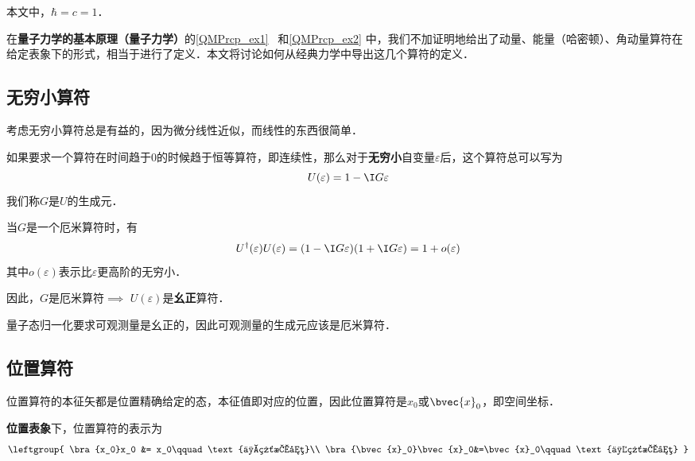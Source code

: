 

本文中，$\hbar=c=1$．

在\textbf{量子力学的基本原理（量子力学）}的\autoref{QMPrcp_ex1}~ 和\autoref{QMPrcp_ex2} 中，我们不加证明地给出了动量、能量（哈密顿）、角动量算符在给定表象下的形式，相当于进行了定义．本文将讨论如何从经典力学中导出这几个算符的定义．

\subsection{无穷小算符}

考虑无穷小算符总是有益的，因为微分线性近似，而线性的东西很简单．

如果要求一个算符在时间趋于$0$的时候趋于恒等算符，即连续性，那么对于\textbf{无穷小}自变量$\varepsilon$后，这个算符总可以写为
\begin{equation}\label{OprQM_eq1}
U(\varepsilon) = 1-\I G\varepsilon
\end{equation}
我们称$G$是$U$的生成元．

当$G$是一个厄米算符时，有
\begin{equation}
U^{\dagger}(\varepsilon)U(\varepsilon) = (1-\I G\varepsilon)(1+\I G\varepsilon) = 1+o(\varepsilon)
\end{equation}
其中$o(\varepsilon)$表示比$\varepsilon$更高阶的无穷小．

因此，$G$是厄米算符$\implies$ $U(\varepsilon)$是\textbf{幺正}算符．

量子态归一化要求可观测量是幺正的，因此可观测量的生成元应该是厄米算符．



\subsection{位置算符}

位置算符的本征矢都是位置精确给定的态，本征值即对应的位置，因此位置算符是$x_0$或$\bvec{x}_0$，即空间坐标．

\textbf{位置表象}下，位置算符的表示为
\begin{equation}
\leftgroup{
    \bra{x_0}x_0 &= x_0\qquad\text{一维情况}\\
    \bra{\bvec{x}_0}\bvec{x}_0&=\bvec{x}_0\qquad\text{三维情况}
    }
\end{equation}

